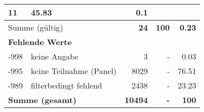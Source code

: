 \begin{longtable}{lXrrr}
       \num{11} &
       \num[round-mode=places,round-precision=2]{45.83} &
         \num[round-mode=places,round-precision=2]{0.1} \\
     \midrule
     \multicolumn{2}{l}{Summe (gültig)} &
       \textbf{\num{24}} &
     \textbf{\num{100}} &
       \textbf{\num[round-mode=places,round-precision=2]{0.23}} \\
     \multicolumn{5}{l}{\textbf{Fehlende Werte}}\\
       -998 &
       keine Angabe &
         \num{3} &
        - &
         \num[round-mode=places,round-precision=2]{0.03} \\
       -995 &
       keine Teilnahme (Panel) &
         \num{8029} &
        - &
         \num[round-mode=places,round-precision=2]{76.51} \\
       -989 &
       filterbedingt fehlend &
         \num{2438} &
        - &
         \num[round-mode=places,round-precision=2]{23.23} \\
     \midrule
     \multicolumn{2}{l}{\textbf{Summe (gesamt)}} &
          \textbf{\num{10494}} &
        \textbf{-} &
        \textbf{\num{100}} \\
     \bottomrule
     \end{longtable}
     

